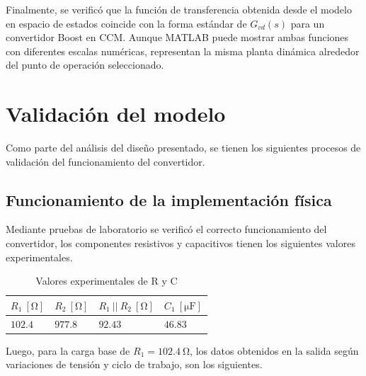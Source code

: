 \documentclass[conference]{IEEEtran}
\begin{document}
Finalmente, se verificó que la función de transferencia obtenida desde el modelo en espacio de estados coincide con la forma estándar de $G_{vd}(s)$ para un convertidor Boost en CCM. Aunque MATLAB puede mostrar ambas funciones con diferentes escalas numéricas, representan la misma planta dinámica alrededor del punto de operación seleccionado.




\section{Validación del modelo}
Como parte del análisis del diseño presentado, se tienen los siguientes procesos de 
validación del funcionamiento del convertidor. 

\subsection{Funcionamiento de la implementación física}
Mediante pruebas de laboratorio se verificó el correcto funcionamiento del convertidor, los componentes resistivos 
y capacitivos tienen los siguientes valores experimentales. 

\begin{table}[H]
    \centering
    \renewcommand{\arraystretch}{1.5}
    \begin{tabularx}{\columnwidth}{
        >{\hsize=0.75\hsize}X 
        >{\hsize=0.75\hsize}X 
        >{\hsize=0.75\hsize}X 
        >{\hsize=0.75\hsize}X
    }
        \toprule
        $R_1~\mathrm{[\Omega]}$ & $R_2~\mathrm{[\Omega]}$ & $R_1~||~R_2~\mathrm{[\Omega]}$ & $C_1~\mathrm{[\mu F]}$\\
        \midrule
        $102.4$               & $977.8$               & $92.43$                      & $46.83$             \\
        \bottomrule
    \end{tabularx}
    \caption{Valores experimentales de R y C}
    \label{tab:componentes_experimentales}
\end{table}

Luego, para la carga base de $R_1 = 102.4~\mathrm{\Omega}$, los datos obtenidos en la salida según variaciones de tensión
y ciclo de trabajo, son los siguientes. 
\end{document}
